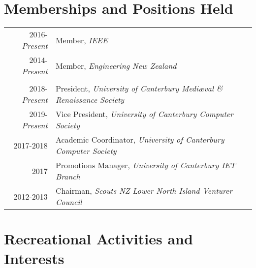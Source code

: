 \documentclass[a4paper,10pt]{article} %
\begin{document}

\section{Memberships and Positions Held}

\begin{tabular}{rl}

2016-\emph{Present} & Member, \emph{IEEE} \\
2014-\emph{Present} & Member, \emph{Engineering New Zealand} \\
&\\
2018-\emph{Present} & President, \emph{University of Canterbury Medi\ae val \& Renaissance Society} \\
2019-\emph{Present} & Vice President, \emph{University of Canterbury Computer Society} \\
2017-2018 & Academic Coordinator, \emph{University of Canterbury Computer Society} \\
2017 & Promotions Manager, \emph{University of Canterbury IET Branch} \\
2012-2013 & Chairman, \emph{Scouts NZ Lower North Island Venturer Council} \\
 




\end{tabular}






\section{Recreational Activities and Interests}
\end{document}
